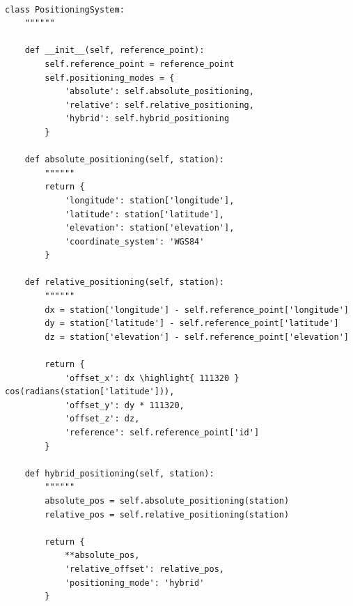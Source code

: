 \hypertarget{section-142}{%
\paragraph{}\label{section-142}}

\begin{lstlisting}[style=python]
class PositioningSystem:
    """"""
    
    def __init__(self, reference_point):
        self.reference_point = reference_point
        self.positioning_modes = {
            'absolute': self.absolute_positioning,
            'relative': self.relative_positioning,
            'hybrid': self.hybrid_positioning
        }
    
    def absolute_positioning(self, station):
        """"""
        return {
            'longitude': station['longitude'],
            'latitude': station['latitude'],
            'elevation': station['elevation'],
            'coordinate_system': 'WGS84'
        }
    
    def relative_positioning(self, station):
        """"""
        dx = station['longitude'] - self.reference_point['longitude']
        dy = station['latitude'] - self.reference_point['latitude']
        dz = station['elevation'] - self.reference_point['elevation']
        
        return {
            'offset_x': dx \highlight{ 111320 } cos(radians(station['latitude'])),
            'offset_y': dy * 111320,
            'offset_z': dz,
            'reference': self.reference_point['id']
        }
    
    def hybrid_positioning(self, station):
        """"""
        absolute_pos = self.absolute_positioning(station)
        relative_pos = self.relative_positioning(station)
        
        return {
            **absolute_pos,
            'relative_offset': relative_pos,
            'positioning_mode': 'hybrid'
        }
\end{lstlisting}

\hypertarget{section-143}{%
\subsubsection{}\label{section-143}}

\hypertarget{section-144}{%
\paragraph{}\label{section-144}}

